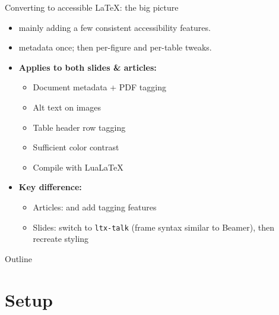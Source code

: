 \begin{frame}{Converting to accessible \LaTeX: the big picture}
\begin{itemize}
\item {} mainly adding a few consistent accessibility features.
\item {} metadata once; then per-figure and per-table tweaks.

\bigskip

\item \textbf{Applies to both slides \& articles:}
  \begin{itemize}
  \item Document metadata + PDF tagging
  \item Alt text on images
  \item Table header row tagging
  \item Sufficient color contrast
  \item Compile with Lua\LaTeX
  \end{itemize}

\bigskip

\item \textbf{Key difference:}
  \begin{itemize}
  \item Articles:  and add tagging features
  \item Slides: switch to \texttt{ltx-talk} (frame syntax similar to Beamer), then recreate styling
  \end{itemize}
\end{itemize}
\end{frame}

\setcounter{tocdepth}{1}
\setcounter{secnumdepth}{2}

\begin{frame}{Outline}
\begin{OutlineTOC}
  \tableofcontents
\end{OutlineTOC}
\end{frame}


\section{Setup}

